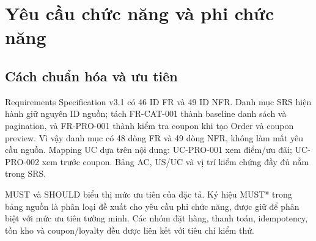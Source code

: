 \section{Yêu cầu chức năng và phi chức năng}
\label{sec:requirements-summary}
\subsection{Cách chuẩn hóa và ưu tiên}

Requirements Specification v3.1 có 46 ID FR và 49 ID NFR. Danh mục SRS hiện hành giữ nguyên ID nguồn; tách FR-CAT-001 thành baseline danh sách và pagination, và FR-PRO-001 thành kiểm tra coupon khi tạo Order và coupon preview. Vì vậy danh mục có 48 dòng FR và 49 dòng NFR, không làm mất yêu cầu nguồn. Mapping UC dựa trên nội dung: UC-PRO-001 xem điểm/ưu đãi; UC-PRO-002 xem trước coupon. Bảng AC, US/UC và vị trí kiểm chứng đầy đủ nằm trong SRS.
\par

MUST và SHOULD biểu thị mức ưu tiên của đặc tả. Ký hiệu MUST* trong bảng nguồn là phân loại đề xuất cho yêu cầu phi chức năng, được giữ để phân biệt với mức ưu tiên tường minh. Các nhóm đặt hàng, thanh toán, idempotency, tồn kho và coupon/loyalty đều được liên kết với tiêu chí kiểm thử.
\par

